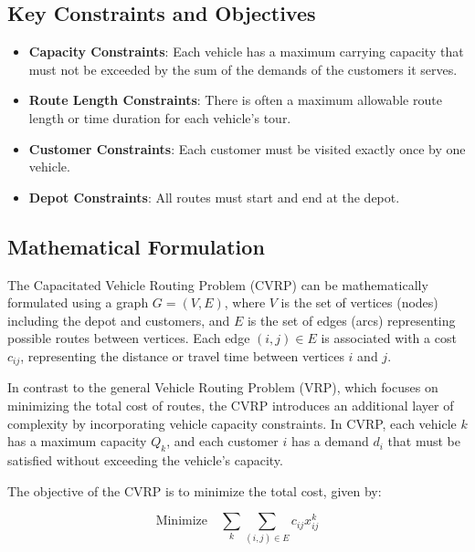 \documentclass{article}
\begin{document}
    \subsection{Key Constraints and Objectives}\label{subsec:key-constraints-and-objectives}

    \begin{itemize}
        \item \textbf{Capacity Constraints}: Each vehicle has a maximum carrying capacity that must not be exceeded by the sum of the demands of the customers it serves.
        \item \textbf{Route Length Constraints}: There is often a maximum allowable route length or time duration for each vehicle’s tour.
        \item \textbf{Customer Constraints}: Each customer must be visited exactly once by one vehicle.
        \item \textbf{Depot Constraints}: All routes must start and end at the depot.
    \end{itemize}

    \subsection{Mathematical Formulation}\label{subsec:mathematical-formulation}

    The Capacitated Vehicle Routing Problem (CVRP) can be mathematically formulated using a graph $G = (V, E)$, where $V$ is the set of vertices (nodes) including the depot and customers, and $E$ is the set of edges (arcs) representing possible routes between vertices. Each edge $(i, j) \in E$ is associated with a cost $c_{ij}$, representing the distance or travel time between vertices $i$ and $j$. \cite{konstantakopoulos2022vehicle}

    In contrast to the general Vehicle Routing Problem (VRP), which focuses on minimizing the total cost of routes, the CVRP introduces an additional layer of complexity by incorporating vehicle capacity constraints. In CVRP, each vehicle $k$ has a maximum capacity $Q_k$, and each customer $i$ has a demand $d_i$ that must be satisfied without exceeding the vehicle's capacity. \cite{toth2014vehicle}

    The objective of the CVRP is to minimize the total cost, given by:

    \begin{equation}
        \text{Minimize} \quad \sum_{k} \sum_{(i,j) \in E} c_{ij} x_{ij}^k
    \end{equation}
\end{document}
